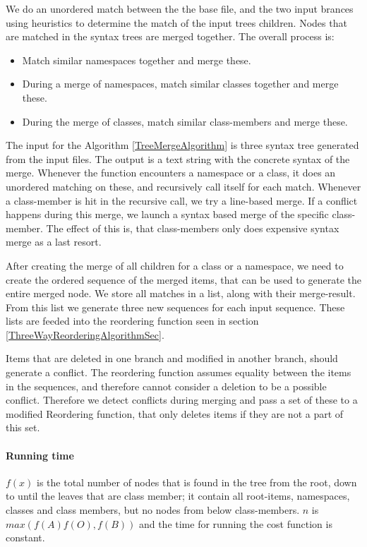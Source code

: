 \documentclass[11pt]{article}
\begin{document}
We do an unordered match between the the base file, and the two input brances using heuristics to determine the match of the input trees children. Nodes that are matched in the syntax trees are merged together. The overall process is:

\begin{itemize}
   \item Match similar namespaces together and merge these.
   \item During a merge of namespaces, match similar classes together and merge these.
   \item During the merge of classes, match similar class-members and merge these.
\end{itemize}

The input for the Algorithm \ref{TreeMergeAlgorithm} is three syntax tree generated from the input files. The output is a text string with the concrete syntax of the merge. Whenever the function encounters a namespace or a class, it does an unordered matching on these, and recursively call itself for each match. Whenever a class-member is hit in the recursive call, we try a line-based merge. If a conflict happens during this merge, we launch a syntax based merge of the specific class-member. The effect of this is, that class-members only does expensive syntax merge as a last resort.

After creating the merge of all children for a class or a namespace, we need to create the ordered sequence of the merged items, that can be used to generate the entire merged node. We store all matches in a list, along with their merge-result. From this list we generate three new sequences for each input sequence. These lists are feeded into the reordering function seen in section \ref{ThreeWayReorderingAlgorithmSec}.

Items that are deleted in one branch and modified in another branch, should generate a conflict. The reordering function assumes equality between the items in the sequences, and therefore cannot consider a deletion to be a possible conflict. Therefore we detect conflicts during merging and pass a set of these to a modified Reordering function, that only deletes items if they are not a part of this set.

\paragraph{Running time} $f(x)$ is the total number of nodes that is found in the tree from the root, down to until the leaves that are class member; it contain all root-items, namespaces, classes and class members, but no nodes from below class-members. $n$ is $max(f(A) f(O), f(B))$ and the time for running the cost function is constant. 
\end{document}
